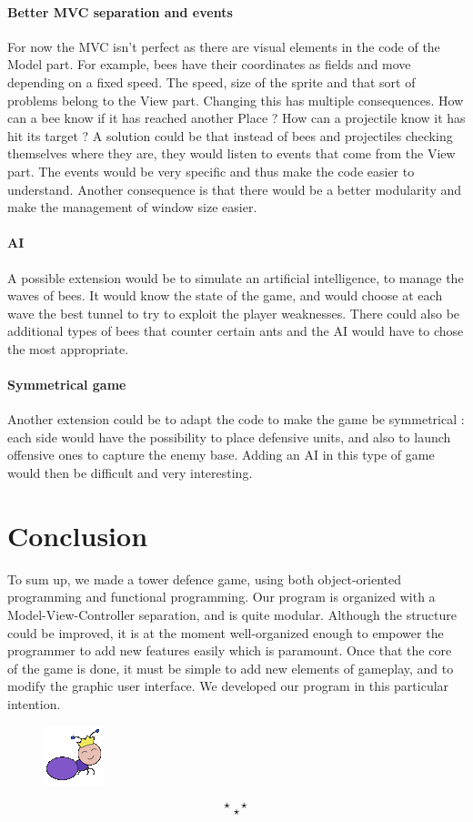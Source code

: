 \documentclass[
	a4paper
]{article}
\newcommand{\theEnd}{\[\star ~ ~ ~ \star\]\[\star\]}
\begin{document}
\paragraph{Better MVC separation and events} For now the MVC isn't perfect as there are visual elements in the code of the Model part. %
For example, bees have their coordinates as fields and move depending on a fixed speed. %
The speed, size of the sprite and that sort of problems belong to the View part. %
Changing this has multiple consequences. How can a bee know if it has reached another Place ? %
How can a projectile know it has hit its target ? %
A solution could be that instead of bees and projectiles checking themselves where they are, they would listen to events that come from the View part. %
The events would be very specific and thus make the code easier to understand. %
Another consequence is that there would be a better modularity and make the management of window size easier.

\paragraph{AI} A possible extension would be to simulate an artificial intelligence, to manage the waves of bees. %
It would know the state of the game, and would choose at each wave the best tunnel to try to exploit the player weaknesses. %
There could also be additional types of bees that counter certain ants and the AI would have to chose the most appropriate.

\paragraph{Symmetrical game} Another extension could be to adapt the code to make the game be symmetrical : %
each side would have the possibility to place defensive units, and also to launch offensive ones to capture the enemy base. %
Adding an AI in this type of game would then be difficult and very interesting.


\section*{Conclusion}

To sum up, we made a tower defence game, using both object-oriented programming and functional programming. %
Our program is organized with a Model-View-Controller separation, and is quite modular. %
Although the structure could be improved, it is at the moment well-organized enough to empower the programmer to add new features easily which is paramount. %
Once that the core of the game is done, it must be simple to add new elements of gameplay, and to modify the graphic user interface. %
We developed our program in this particular intention.


%
\begin{figure}[H]
	\includegraphics[scale=0.5]{ant_queen.png}
\end{figure}
%

\theEnd
\end{document}
